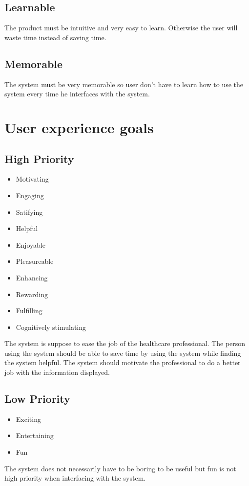 \subsection{Learnable}
The product must be intuitive and very easy to learn. Otherwise the user will waste time instead of saving time.

\subsection{Memorable}
The system must be very memorable so user don't have to learn how to use the system every time he interfaces with the system.


\section{User experience goals}
\subsection{High Priority}
\begin{itemize}
\item Motivating
\item Engaging
\item Satifying
\item Helpful
\item Enjoyable
\item Pleasureable
\item Enhancing
\item Rewarding
\item Fulfilling
\item Cognitively stimulating
\end{itemize}
The system is suppose to ease the job of the healthcare professional. The person using the system should be able to save time by using the system while finding the system helpful. The system should motivate the professional to do a better job with the information displayed. 

\subsection{Low Priority}
\begin{itemize}
\item Exciting
\item Entertaining
\item Fun
\end{itemize}
The system does not necessarily have to be boring to be useful but fun is not high priority when interfacing with the system.

